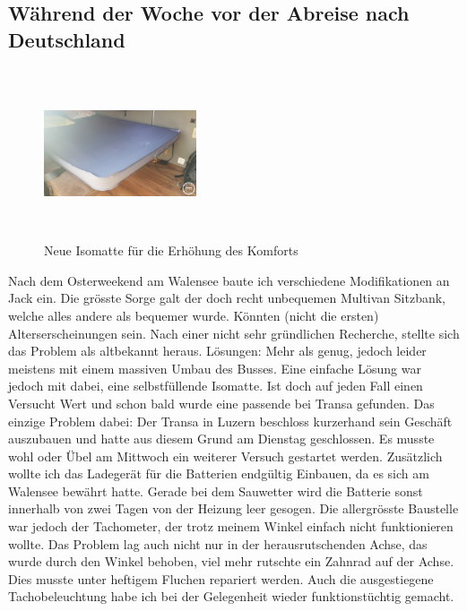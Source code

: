 \subsection{Während der Woche vor der Abreise nach Deutschland}

\begin{figure} 
  \begin{centering}
    \includegraphics[width=0.4\textwidth, height=5cm, keepaspectratio]{../Bilder/Sinsheim/47.jpg}
    \caption{Neue Isomatte für die Erhöhung des Komforts}
  \end{centering}
\end{figure} 

Nach dem Osterweekend am Walensee baute ich verschiedene Modifikationen an Jack ein.
Die grösste Sorge galt der doch recht unbequemen Multivan Sitzbank, welche alles andere als bequemer wurde.
Könnten (nicht die ersten) Alterserscheinungen sein.
Nach einer nicht sehr gründlichen Recherche, stellte sich das Problem als altbekannt heraus.
Lösungen: Mehr als genug, jedoch leider meistens mit einem massiven Umbau des Busses.
Eine einfache Lösung war jedoch mit dabei, eine selbstfüllende Isomatte.
Ist doch auf jeden Fall einen Versucht Wert und schon bald wurde eine passende bei Transa gefunden.
Das einzige Problem dabei: Der Transa in Luzern beschloss kurzerhand sein Geschäft auszubauen und hatte aus diesem Grund am Dienstag geschlossen.
Es musste wohl oder Übel am Mittwoch ein weiterer Versuch gestartet werden.
Zusätzlich wollte ich das Ladegerät für die Batterien endgültig Einbauen, da es sich am Walensee bewährt hatte.
Gerade bei dem Sauwetter wird die Batterie sonst innerhalb von zwei Tagen von der Heizung leer gesogen.
Die allergrösste Baustelle war jedoch der Tachometer, der trotz meinem Winkel einfach nicht funktionieren wollte.
Das Problem lag auch nicht nur in der herausrutschenden Achse, das wurde durch den Winkel behoben, viel mehr rutschte ein Zahnrad auf der Achse.
Dies musste unter heftigem Fluchen repariert werden.
Auch die ausgestiegene Tachobeleuchtung habe ich bei der Gelegenheit wieder funktionstüchtig gemacht. 

